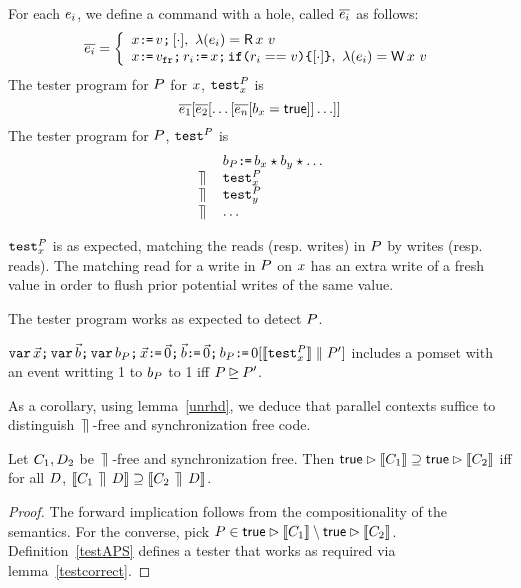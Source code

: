 \begin{definition}
For each $e_i$, we define a command with a hole, called $\overline{e_i}$ as follows:
\[
\test{\aEv_i} = \left\{ 
                             \begin{array}{l}
                              \aLoc\GETS\aVal \SEMI \hole{\cdot}, \ \labeling(\aEv_i) = \DR{\aLoc}{\aVal} \\
                              \aLoc\GETS\freshaval\SEMI \aReg_i \GETS\aLoc \SEMI \IF{\aReg_i == \aVal} \THEN \hole{\cdot} \FI , \ \labeling(\aEv_i) = \DW{\aLoc}{\aVal} \\
                           \end{array}
                       \right.
\]    
The tester program for $P$ for $x$, ${\tt test}^{P}_{x}$ is \[ \overline{e_1}[\overline{e_2}[\ldots [\overline{e_n}[b_{x} = \mathsf{true}]]\ldots]] \]
The tester program for $P$, ${\tt test}^{P}_{}$ is 
\[
\begin{array}{ll}
& b_{P}\texttt{:}\mkern-1mu\texttt{=}\, b_{x} \star b_{y} \star  \ldots   \\
\,\mathbin{\rrceil}\, & {\tt test}^{P}_{x} \\
\,\mathbin{\rrceil}\, & {\tt test}^{P}_{y} \\
 \,\mathbin{\rrceil}\,  & \ldots 
\end{array}
\]
\end{definition}
 ${\tt test}^{P}_{x}$ is as expected, matching the reads (resp. writes) in $P$ by writes (resp. reads).  The matching read for a write in $P$ on $x$ has an extra write of a fresh value in order to flush prior potential writes of the same value.  

The tester program works as expected to detect $P$.  
\begin{lemma}\label{testcorrect}
$\texttt{var}\,\vec{x}\texttt{;}\, \texttt{var}\,\vec{b} \texttt{;}\, \texttt{var}\, b_{P} \texttt{;}\,
    \vec{x}\texttt{:}\mkern-1mu\texttt{=}\,\vec{0}\texttt{;}\,
    \vec{b}\texttt{:}\mkern-1mu\texttt{=}\,\vec{0} \texttt{;}\, b_{P}\texttt{:}\mkern-1mu\texttt{=}\, 0 [\llbracket{\tt test}^{P}_{x}\rrbracket \parallel P']$
includes a pomset with an event writting 1 to $b_{P}$ to 1 iff $P \unrhd P'$.
\end{lemma}
As a corollary, using lemma~\ref{unrhd}, we deduce that parallel contexts suffice to distinguish  $\,\mathbin{\rrceil}\,$-free and synchronization free code.
\begin{theorem}
Let $C_1, D_2$ be $\,\mathbin{\rrceil}\,$-free and synchronization free.  Then $\mathsf{true}\mathbin\rhd \llbracket C_1\rrbracket  \supseteq \mathsf{true}\mathbin\rhd \llbracket C_2\rrbracket$ iff for all $D$,  $\llbracket C_1\,\mathbin{\rrceil}\, D\rrbracket  \supseteq \llbracket C_2 \,\mathbin{\rrceil}\, D\rrbracket$.
\end{theorem}
\begin{proof}
The forward implication follows from the compositionality of the semantics. For the converse, pick $P \in \mathsf{true}\mathbin\rhd \llbracket C_1\rrbracket \setminus \mathsf{true}\mathbin\rhd \llbracket C_2\rrbracket $.  Definition~\ref{testAPS} defines a tester that works as required via lemma~\ref{testcorrect}.
\end{proof}

\endinput 



